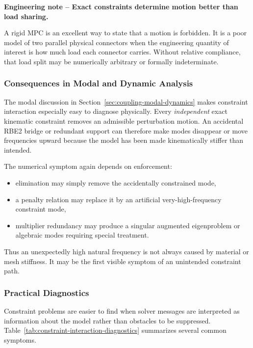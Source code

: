 \begin{bbox}
\textbf{Engineering note -- Exact constraints determine motion better than load sharing.}

A rigid MPC is an excellent way to state that a motion is forbidden. It is a
poor model of two parallel physical connectors when the engineering quantity of
interest is how much load each connector carries. Without relative compliance,
that load split may be numerically arbitrary or formally indeterminate.
\end{bbox}

\subsubsection{Consequences in Modal and Dynamic Analysis}

The modal discussion in Section~\ref{sec:coupling-modal-dynamics} makes
constraint interaction especially easy to diagnose physically. Every
\emph{independent} exact kinematic constraint removes an admissible perturbation
motion. An accidental RBE2 bridge or redundant support can therefore make modes
disappear or move frequencies upward because the model has been made
kinematically stiffer than intended.

The numerical symptom again depends on enforcement:

\begin{itemize}
    \item elimination may simply remove the accidentally constrained mode,
    \item a penalty relation may replace it by an artificial very-high-frequency
          constraint mode,
    \item multiplier redundancy may produce a singular augmented eigenproblem
          or algebraic modes requiring special treatment.
\end{itemize}

Thus an unexpectedly high natural frequency is not always caused by material or
mesh stiffness. It may be the first visible symptom of an unintended constraint
path.

\subsubsection{Practical Diagnostics}

Constraint problems are easier to find when solver messages are interpreted as
information about the model rather than obstacles to be suppressed.
Table~\ref{tab:constraint-interaction-diagnostics} summarizes several common
symptoms.

